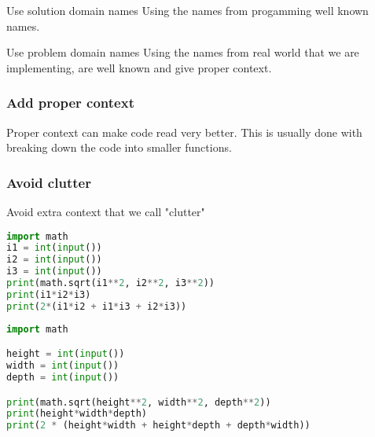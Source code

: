 \documentclass{beamer}
\begin{document}
\begin{frame}{Use solution domain names}
  Using the names from progamming well known names.
\end{frame}

\begin{frame}{Use problem domain names}
  Using the names from real world that we are implementing, are well known and give proper context.
\end{frame}

\begin{frame}
  \frametitle{Add proper context}
  Proper context can make code read very better.
  This is usually done with breaking down the code into smaller functions.
\end{frame}

\begin{frame}
  \frametitle{Avoid clutter}
  Avoid extra context that we call "clutter"
\end{frame}
\begin{frame}[fragile]
  \begin{lstlisting}[language=Python]
import math
i1 = int(input())
i2 = int(input())
i3 = int(input())
print(math.sqrt(i1**2, i2**2, i3**2))
print(i1*i2*i3)
print(2*(i1*i2 + i1*i3 + i2*i3))\end{lstlisting}
\end{frame}
\begin{frame}[fragile]
  \begin{lstlisting}[language=Python]
import math

height = int(input())
width = int(input())
depth = int(input())

print(math.sqrt(height**2, width**2, depth**2))
print(height*width*depth)
print(2 * (height*width + height*depth + depth*width))\end{lstlisting}
\end{frame}
\end{document}
